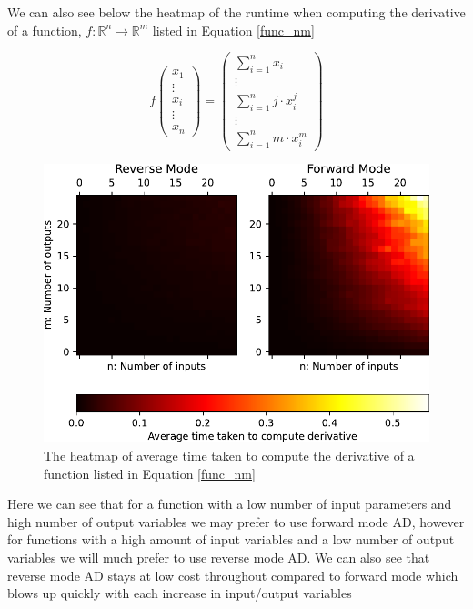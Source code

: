 \documentclass{article}
\begin{document}
We can also see below the heatmap of the runtime when computing the derivative of a function, $f: \mathbb{R}^n \rightarrow \mathbb{R}^m$ listed in Equation \ref{func_nm}

\begin{equation}
    f \begin{pmatrix}
        x_1 \\ \vdots \\ x_i \\ \vdots \\ x_n
    \end{pmatrix} = \begin{pmatrix}
        \sum_{i=1}^n x_i \\ \vdots \\ \sum_{i=1}^n j \cdot x_{i}^{j} \\ \vdots \\ \sum_{i=1}^n m \cdot x_{i}^{m}
    \end{pmatrix}
    \label{func_nm}
\end{equation}


\begin{figure}[h]
    \centering
    \includegraphics{images/Graph_HeatmapTimeDiff.pdf}
    \caption{The heatmap of average time taken to compute the derivative of a function listed in Equation \ref{func_nm}}
    \label{fig:heatmap}
\end{figure}

Here we can see that for a function with a low number of input parameters and high number of output variables we may prefer to use forward mode AD, however for functions with a high amount of input variables and a low number of output variables we will much prefer to use reverse mode AD. We can also see that reverse mode AD stays at low cost throughout compared to forward mode which blows up quickly with each increase in input/output variables
\end{document}
